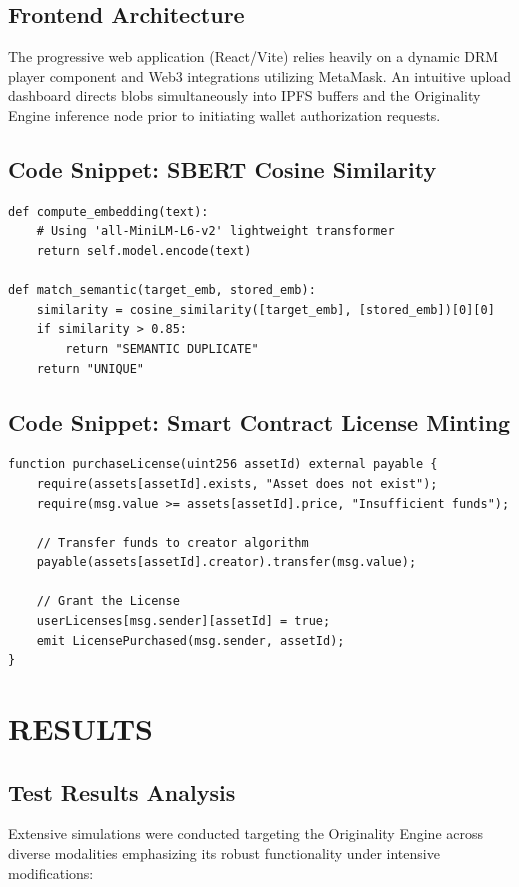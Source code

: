\documentclass[12pt,a4paper]{report}
\begin{document}
\section{Frontend Architecture}
The progressive web application (React/Vite) relies heavily on a dynamic DRM player component and Web3 integrations utilizing MetaMask. An intuitive upload dashboard directs blobs simultaneously into IPFS buffers and the Originality Engine inference node prior to initiating wallet authorization requests.

\section{Code Snippet: SBERT Cosine Similarity}
\begin{verbatim}
def compute_embedding(text):
    # Using 'all-MiniLM-L6-v2' lightweight transformer
    return self.model.encode(text)

def match_semantic(target_emb, stored_emb):
    similarity = cosine_similarity([target_emb], [stored_emb])[0][0]
    if similarity > 0.85:
        return "SEMANTIC DUPLICATE"
    return "UNIQUE"
\end{verbatim}

\section{Code Snippet: Smart Contract License Minting}
\begin{verbatim}
function purchaseLicense(uint256 assetId) external payable {
    require(assets[assetId].exists, "Asset does not exist");
    require(msg.value >= assets[assetId].price, "Insufficient funds");
    
    // Transfer funds to creator algorithm
    payable(assets[assetId].creator).transfer(msg.value);
    
    // Grant the License
    userLicenses[msg.sender][assetId] = true;
    emit LicensePurchased(msg.sender, assetId);
}
\end{verbatim}

\chapter{RESULTS}

\section{Test Results Analysis}
Extensive simulations were conducted targeting the Originality Engine across diverse modalities emphasizing its robust functionality under intensive modifications:
\end{document}
